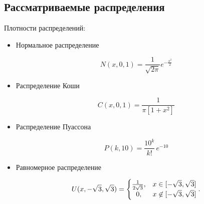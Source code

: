\subsection{Рассматриваемые распределения}
Плотности распределений:
\begin{itemize}
	\item{Нормальное распределение}
	
	\begin{equation}
		N(x, 0, 1) = \frac{1}{ \sqrt {2\pi } }e^{-\frac{{x}^2 }{2}}
	\end{equation}
	
	\item{Распределение Коши}
	
	\begin{equation}
		C(x, 0, 1) =  \frac{1}{\pi \left[1 + {x}^2\right]}
	\end{equation}
		
	\item{Распределение Пуассона}
	
	\begin{equation} 
		P(k, 10) = \frac{10^k}{k!}\, e^{-10}
	\end{equation}
	
	\item{Равномерное распределение}
	
	\begin{equation} 
		U(x, -\sqrt{3}, \sqrt{3}) = \left\{
		\begin{matrix}
			{1 \over 2\sqrt{3}}, & x\in [-\sqrt{3},\sqrt{3}] \\
			0, & x\not\in [-\sqrt{3},\sqrt{3}]
		\end{matrix}
		\right..
	\end{equation}
	
\end{itemize}